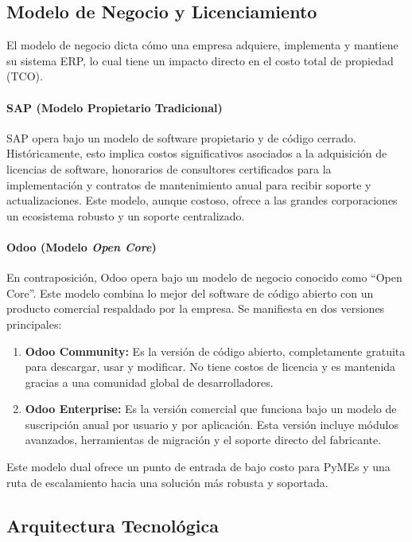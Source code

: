 \documentclass[12pt,letterpaper,spanish]{report}
\begin{document}
\subsection{Modelo de Negocio y Licenciamiento}

El modelo de negocio dicta cómo una empresa adquiere, implementa y mantiene su sistema ERP, lo cual tiene un impacto directo en el costo total de propiedad (TCO).

\paragraph{SAP (Modelo Propietario Tradicional)}
SAP opera bajo un modelo de software propietario y de código cerrado. Históricamente, esto implica costos significativos asociados a la adquisición de licencias de software, honorarios de consultores certificados para la implementación y contratos de mantenimiento anual para recibir soporte y actualizaciones. Este modelo, aunque costoso, ofrece a las grandes corporaciones un ecosistema robusto y un soporte centralizado.

\paragraph{Odoo (Modelo \textit{Open Core})}
En contraposición, Odoo opera bajo un modelo de negocio conocido como ``Open Core''. Este modelo combina lo mejor del software de código abierto con un producto comercial respaldado por la empresa. Se manifiesta en dos versiones principales:
\begin{enumerate}
    \item \textbf{Odoo Community:} Es la versión de código abierto, completamente gratuita para descargar, usar y modificar. No tiene costos de licencia y es mantenida gracias a una comunidad global de desarrolladores.
    \item \textbf{Odoo Enterprise:} Es la versión comercial que funciona bajo un modelo de suscripción anual por usuario y por aplicación. Esta versión incluye módulos avanzados, herramientas de migración y el soporte directo del fabricante.
\end{enumerate}
Este modelo dual ofrece un punto de entrada de bajo costo para PyMEs y una ruta de escalamiento hacia una solución más robusta y soportada.

\subsection{Arquitectura Tecnológica}
\end{document}
